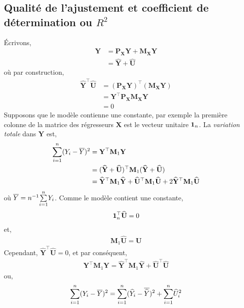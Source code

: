 \subsection{Qualité de l'ajustement et coefficient de détermination ou $R^2$}
\'Ecrivons,
\begin{align*}
\mathbf{Y} &= \mathbf{P}_\mathbf{X}\mathbf{Y}+ \mathbf{M}_\mathbf{X}\mathbf{Y}\\
&=\widehat{\mathbf{Y}}+\widehat{\mathbf{U}}
\end{align*}
où par construction,
\begin{align*}
\widehat{\mathbf{Y}}^\top\widehat{\mathbf{U}} &= (\mathbf{P}_\mathbf{X}\mathbf{Y})^\top (\mathbf{M}_\mathbf{X}\mathbf{Y})\\ 
&= \mathbf{Y}^\top  \mathbf{P}_\mathbf{X} \mathbf{M}_\mathbf{X}\mathbf{Y}\\
& = 0
\end{align*}
Supposons que le modèle contienne une constante, par exemple la première colonne de la matrice des régresseurs $\mathbf{X}$ est le vecteur unitaire $\mathbf{1}_n$. La \emph{variation totale} dans $\mathbf{Y}$ est,
\begin{align*}
\underset{i=1}{\overset{n}{\sum}}(Y_i - \overline{Y})^2 &= \mathbf{Y}^\top\mathbf{M}_1\mathbf{Y}\\
&=(\widehat{\mathbf{Y}}  + \widehat{\mathbf{U}} )^\top\mathbf{M}_1(\widehat{\mathbf{Y}}  + \widehat{\mathbf{U}} )\\
&=\widehat{\mathbf{Y}}^\top\mathbf{M}_1\widehat{\mathbf{Y}} + \widehat{\mathbf{U}}^\top\mathbf{M}_1\widehat{\mathbf{U}} + 2\widehat{\mathbf{Y}}^\top\mathbf{M}_1\widehat{\mathbf{U}}
\end{align*}
où $\overline{Y} = n^{-1}\underset{i=1}{\overset{n}{\sum}} Y_i$. Comme le modèle contient une constante,
\begin{align*}
\mathbf{1}_n^\top\widehat{\mathbf{U}} = 0
\end{align*}
et,
\begin{align*}
\mathbf{M}_1\widehat{\mathbf{U}} =\widehat{\mathbf{U}}  
\end{align*}
Cependant, $\widehat{\mathbf{Y}}^\top \widehat{\mathbf{U}} =0$, et par conséquent,
\begin{align*}
\mathbf{Y}^\top\mathbf{M}_1\mathbf{Y} = \widehat{\mathbf{Y}}^\top\mathbf{M}_1\widehat{\mathbf{Y}} +
\widehat{\mathbf{U}}^\top\widehat{\mathbf{U}} 
\end{align*}
ou,
\begin{align*}
\underset{i=1}{\overset{n}{\sum}}(Y_i-\overline{Y})^2 = \underset{i=1}{\overset{n}{\sum}}(\widehat{Y}_i - \overline{\widehat{Y}})^2 + \underset{i=1}{\overset{n}{\sum}} \widehat{U}_i^2
\end{align*}
